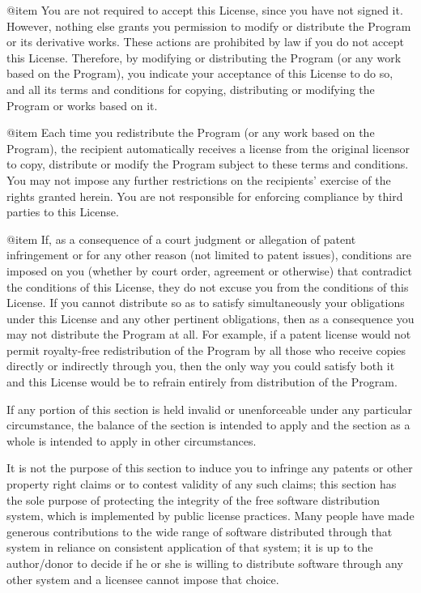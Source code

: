 @item
You are not required to accept this License, since you have not
signed it.  However, nothing else grants you permission to modify or
distribute the Program or its derivative works.  These actions are
prohibited by law if you do not accept this License.  Therefore, by
modifying or distributing the Program (or any work based on the
Program), you indicate your acceptance of this License to do so, and
all its terms and conditions for copying, distributing or modifying
the Program or works based on it.

@item
Each time you redistribute the Program (or any work based on the
Program), the recipient automatically receives a license from the
original licensor to copy, distribute or modify the Program subject to
these terms and conditions.  You may not impose any further
restrictions on the recipients' exercise of the rights granted herein.
You are not responsible for enforcing compliance by third parties to
this License.

@item
If, as a consequence of a court judgment or allegation of patent
infringement or for any other reason (not limited to patent issues),
conditions are imposed on you (whether by court order, agreement or
otherwise) that contradict the conditions of this License, they do not
excuse you from the conditions of this License.  If you cannot
distribute so as to satisfy simultaneously your obligations under this
License and any other pertinent obligations, then as a consequence you
may not distribute the Program at all.  For example, if a patent
license would not permit royalty-free redistribution of the Program by
all those who receive copies directly or indirectly through you, then
the only way you could satisfy both it and this License would be to
refrain entirely from distribution of the Program.

If any portion of this section is held invalid or unenforceable under
any particular circumstance, the balance of the section is intended to
apply and the section as a whole is intended to apply in other
circumstances.

It is not the purpose of this section to induce you to infringe any
patents or other property right claims or to contest validity of any
such claims; this section has the sole purpose of protecting the
integrity of the free software distribution system, which is
implemented by public license practices.  Many people have made
generous contributions to the wide range of software distributed
through that system in reliance on consistent application of that
system; it is up to the author/donor to decide if he or she is willing
to distribute software through any other system and a licensee cannot
impose that choice.

